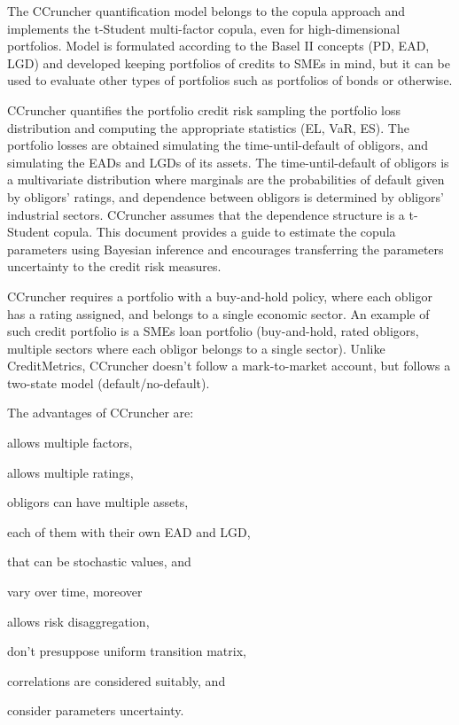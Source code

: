 \documentclass[11pt,fleqn]{book} %
\begin{document}
The CCruncher quantification model belongs to the copula approach and 
implements the t-Student multi-factor copula, even for high-dimensional 
portfolios. Model is formulated according to the Basel II concepts (PD, 
EAD, LGD) and developed keeping portfolios of credits to SMEs in mind, 
but it can be used to evaluate other types of portfolios such as 
portfolios of bonds or otherwise.

CCruncher quantifies the portfolio credit risk sampling the portfolio loss
distribution and computing the appropriate statistics (EL, VaR, ES). The 
portfolio losses are obtained simulating the time-until-default of obligors, 
and simulating the EADs and LGDs of its assets. The time-until-default of 
obligors is a multivariate distribution where marginals are the probabilities 
of default given by obligors' ratings, and dependence between obligors is 
determined by obligors' industrial sectors.
CCruncher assumes that the dependence structure is a t-Student copula.
This document provides a guide to estimate the copula parameters using
Bayesian inference and encourages transferring the parameters uncertainty
to the credit risk measures.

CCruncher requires a portfolio with a buy-and-hold policy, where each obligor 
has a rating assigned, and belongs to a single economic sector.
An example of such credit portfolio is a SMEs loan portfolio (buy-and-hold, 
rated obligors, multiple sectors where each obligor belongs to a single sector). 
Unlike CreditMetrics\texttrademark{}, CCruncher doesn't follow a mark-to-market 
account, but follows a two-state model (default/no-default). 

The advantages of CCruncher are: 
\begin{inparaenum}[1)]
	\item allows multiple factors,
	\item allows multiple ratings,
	\item obligors can have multiple assets,
	\item each of them with their own EAD and LGD,
	\item that can be stochastic values, and
	\item vary over time, moreover
	\item allows risk disaggregation,
	\item don't presuppose uniform transition matrix,
	\item correlations are considered suitably, and
	\item consider parameters uncertainty.
\end{inparaenum}
\end{document}
